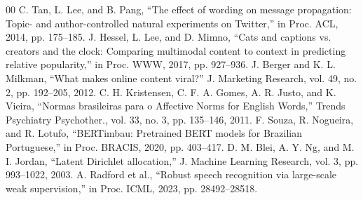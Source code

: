 \documentclass[conference]{IEEEtran}
\begin{document}
\begin{thebibliography}{00}
 C. Tan, L. Lee, and B. Pang, ``The effect of wording on message propagation: Topic- and author-controlled natural experiments on Twitter,'' in Proc. ACL, 2014, pp. 175--185.
 J. Hessel, L. Lee, and D. Mimno, ``Cats and captions vs. creators and the clock: Comparing multimodal content to context in predicting relative popularity,'' in Proc. WWW, 2017, pp. 927--936.
 J. Berger and K. L. Milkman, ``What makes online content viral?'' J. Marketing Research, vol. 49, no. 2, pp. 192--205, 2012.
 C. H. Kristensen, C. F. A. Gomes, A. R. Justo, and K. Vieira, ``Normas brasileiras para o Affective Norms for English Words,'' Trends Psychiatry Psychother., vol. 33, no. 3, pp. 135--146, 2011.
 F. Souza, R. Nogueira, and R. Lotufo, ``BERTimbau: Pretrained BERT models for Brazilian Portuguese,'' in Proc. BRACIS, 2020, pp. 403--417.
 D. M. Blei, A. Y. Ng, and M. I. Jordan, ``Latent Dirichlet allocation,'' J. Machine Learning Research, vol. 3, pp. 993--1022, 2003.
 A. Radford et al., ``Robust speech recognition via large-scale weak supervision,'' in Proc. ICML, 2023, pp. 28492--28518.
\end{thebibliography}
\end{document}
